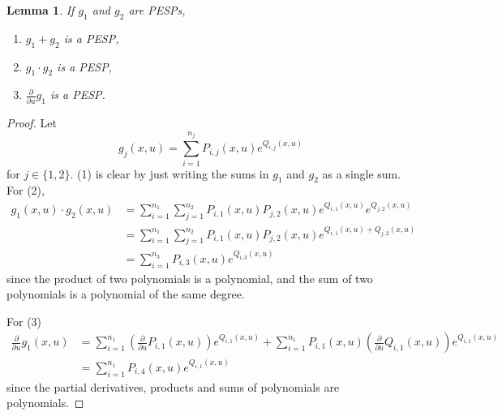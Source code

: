 \documentclass{article}
\theoremstyle{plain}
\newtheorem{lemma}[theorem]{Lemma}
\theoremstyle{definition}
\theoremstyle{remark}
\begin{document}
\begin{lemma}\label{lemma:pesp-products-derivatives}
    If $g_1$ and $g_2$ are PESPs, 
    \begin{enumerate}
        \item $g_1 + g_2$ is a PESP,
        \item $g_1 \cdot g_2$ is a PESP,
        \item $\frac{\partial}{\partial u} g_1$ is a PESP.
    \end{enumerate}
\end{lemma}
\begin{proof}
    Let 
    \begin{equation}
        g_j(x, u) = \sum_{i=1}^{n_j} P_{i,j}(x, u)e^{Q_{i,j}(x, u)}
    \end{equation}
    for $j\in \{1, 2\}$. 
    (1) is clear by just writing the sums in $g_1$ and $g_2$ as a single sum. For (2),
    \begin{equation}
        \begin{split}
            g_1(x, u) \cdot g_2(x, u) 
            &= \sum_{i=1}^{n_1} \sum_{j=1}^{n_2} P_{i,1}(x, u)P_{j,2}(x, u)
            e^{Q_{i,1}(x, u)}e^{Q_{j,2}(x, u)}
            \\&= \sum_{i=1}^{n_1} \sum_{j=1}^{n_2} P_{i,1}(x, u)P_{j,2}(x, u)
            e^{Q_{i,1}(x, u) + Q_{j,2}(x, u)}
            \\&= \sum_{i=1}^{n_3} P_{i, 3}(x, u)e^{Q_{i,3}(x, u)}
        \end{split}
    \end{equation}
    since the product of two polynomials is a polynomial, and the sum
    of two polynomials is a polynomial of the same degree.

    For (3)
    \begin{equation}
        \begin{split}
            \frac{\partial}{\partial u} g_1(x, u)
            &= \sum_{i=1}^{n_1} \left(\frac{\partial}{\partial u}P_{i,1}(x, u)\right)e^{Q_{i,1}(x, u)}
            + \sum_{i=1}^{n_1} P_{i,1}(x, u)\left(\frac{\partial}{\partial u}Q_{i,1}(x, u)\right)e^{Q_{i,1}(x, u)}
            \\&= \sum_{i=1}^{n_1} P_{i, 4}(x, u) e^{Q_{i,1}(x, u)}
        \end{split}
    \end{equation}
    since the partial derivatives, products and sums of polynomials are polynomials.
\end{proof}
\end{document}
